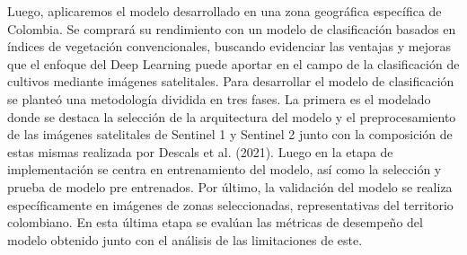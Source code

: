 Luego, aplicaremos el modelo desarrollado en una zona geográfica específica de
Colombia. Se comprará su rendimiento con un modelo de clasificación basados en índices
de vegetación convencionales, buscando evidenciar las ventajas y mejoras que el enfoque
del Deep Learning puede aportar en el campo de la clasificación de cultivos mediante
imágenes satelitales. Para desarrollar el modelo de clasificación se planteó una
metodología dividida en tres fases. La primera es el modelado donde se destaca la
selección de la arquitectura del modelo y el preprocesamiento de las imágenes satelitales
de Sentinel 1 y Sentinel 2 junto con la composición de estas mismas realizada por Descals
et al. (2021). Luego en la etapa de implementación se centra en entrenamiento del modelo,
así como la selección y prueba de modelo pre entrenados. Por último, la validación del
modelo se realiza específicamente en imágenes de zonas seleccionadas, representativas
del territorio colombiano. En esta última etapa se evalúan las métricas de desempeño del
modelo obtenido junto con el análisis de las limitaciones de este.